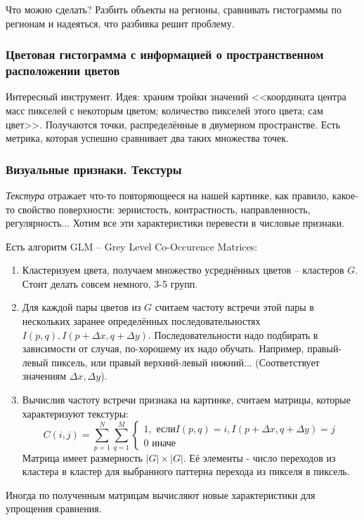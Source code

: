 \documentclass[main.tex]{subfiles}
\begin{document}
Что можно сделать?
Разбить объекты на регионы, сравнивать гистограммы по регионам и надеяться, что разбивка решит проблему.

\subsubsection{Цветовая гистограмма с информацией о пространственном расположении цветов}

Интересный инструмент.
Идея: храним тройки значений <<координата центра масс пикселей с некоторым цветом; количество пикселей этого цвета; сам цвет>>.
Получаются точки, распределённые в двумерном пространстве.
Есть метрика, которая успешно сравнивает два таких множества точек.

\subsubsection{Визуальные признаки. Текстуры}

\emph{Текстура} отражает что-то повторяющееся на нашей картинке, как правило, какое-то свойство поверхности: зернистость, контрастность, направленность, регулярность...
Хотим все эти характеристики перевести в числовые признаки.

Есть алгоритм GLM -- Grey Level Co-Occurence Matrices:

\begin{enumerate}[noitemsep]
    \item Кластеризуем цвета, получаем множество усреднённых цветов -- кластеров $ G $.
    Стоит делать совсем немного, 3-5 групп.
    \item Для каждой пары цветов из $ G $ считаем частоту встречи этой пары в нескольких заранее определённых последовательностях $I(p, q), I(p + \Delta x, q + \Delta y)$.
    Последовательности надо подбирать в зависимости от случая, по-хорошему их надо обучать.
    Например, правый-левый пиксель, или правый верхний-левый нижний... (Соответствует значениям $\Delta x, \Delta y$).
    
    \item Вычислив частоту встречи признака на картинке, считаем матрицы, которые характеризуют текстуры:
    $$ C(i,j) = \sum_{p=1}^{N} \sum_{q=1}^{M} \begin{cases}
    1, \text{ если} I(p, q)=i, I(p + \Delta x, q + \Delta y)=j \\
    0 \text{ иначе}
    \end{cases} $$
    Матрица имеет размерность $ |G| \times |G| $.
    Её элементы - число переходов из кластера в кластер для выбранного паттерна перехода из пикселя в пиксель.
\end{enumerate}
Иногда по полученным матрицам вычисляют новые характеристики для упрощения сравнения.
\end{document}
